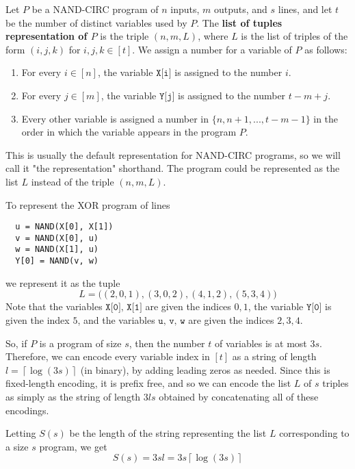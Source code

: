 \documentclass{article}
\begin{document}
  \begin{definition}
  Let $P$ be a NAND-CIRC program of $n$ inputs, $m$ outputs, and $s$ lines, and let $t$ be the number of distinct variables used by $P$. The \textbf{list of tuples representation of $P$} is the triple $(n, m, L)$, where $L$ is the list of triples of the form $(i, j, k)$ for $i, j, k \in [t]$. We assign a number for a variable of $P$ as follows:
  \begin{enumerate}
      \item For every $i \in [n]$, the variable $\texttt{X[i]}$ is assigned to the number $i$. 
      \item For every $j \in [m]$, the variable $\texttt{Y[j]}$ is assigned to the number $t - m + j$.
      \item Every other variable is assigned a number in $\{n, n+1, ..., t-m-1\}$ in the order in which the variable appears in the program $P$. 
  \end{enumerate}
  This is usually the default representation for NAND-CIRC programs, so we will call it "the representation" shorthand. The program could be represented as the list $L$ instead of the triple $(n, m, L)$. 
  \end{definition}

  \begin{example}
  To represent the XOR program of lines 
  \begin{lstlisting}
  u = NAND(X[0], X[1])
  v = NAND(X[0], u) 
  w = NAND(X[1], u)
  Y[0] = NAND(v, w)
  \end{lstlisting}
  we represent it as the tuple 
  \[L = \big( (2, 0, 1), (3, 0, 2), (4, 1, 2), (5, 3, 4)\big) \]
  Note that the variables $\texttt{X[0], X[1]}$ are given the indices $0, 1$, the variable $\texttt{Y[0]}$ is given the index $5$, and the variables $\texttt{u, v, w}$ are given the indices $2, 3, 4$. 
  \end{example}

  So, if $P$ is a program of size $s$, then the number $t$ of variables is at most $3s$. Therefore, we can encode every variable index in $[t]$ as a string of length $l = \left\lceil{\log(3s)}\right\rceil$ (in binary), by adding leading zeros as needed. Since this is fixed-length encoding, it is prefix free, and so we can encode the list $L$ of $s$ triples as simply as the string of length $3ls$ obtained by concatenating all of these encodings. 

  Letting $S(s)$ be the length of the string representing the list $L$ corresponding to a size $s$ program, we get
  \[S(s) = 3sl = 3s \left\lceil{\log(3s)}\right\rceil\]
\end{document}
